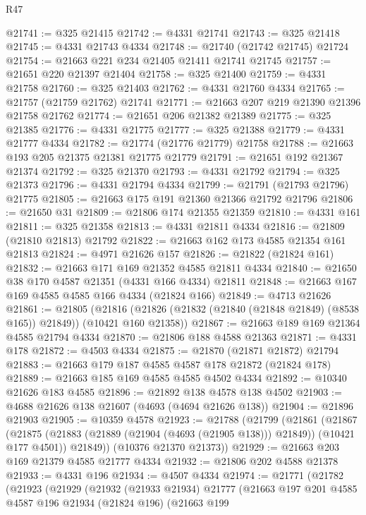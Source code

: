 \begin{lexlean}{R47}
\begin{coremodule}
@21741 := @325 @21415
@21742 := @4331 @21741
@21743 := @325 @21418
@21745 := @4331 @21743 @4334
@21748 := @21740 (@21742 @21745) @21724
@21754 := @21663 @221 @234 @21405 @21411 @21741 @21745
@21757 := @21651 @220 @21397 @21404
@21758 := @325 @21400
@21759 := @4331 @21758
@21760 := @325 @21403
@21762 := @4331 @21760 @4334
@21765 := @21757 (@21759 @21762) @21741
@21771 := @21663 @207 @219 @21390 @21396 @21758 @21762
@21774 := @21651 @206 @21382 @21389
@21775 := @325 @21385
@21776 := @4331 @21775
@21777 := @325 @21388
@21779 := @4331 @21777 @4334
@21782 := @21774 (@21776 @21779) @21758
@21788 := @21663 @193 @205 @21375 @21381 @21775 @21779
@21791 := @21651 @192 @21367 @21374
@21792 := @325 @21370
@21793 := @4331 @21792
@21794 := @325 @21373
@21796 := @4331 @21794 @4334
@21799 := @21791 (@21793 @21796) @21775
@21805 := @21663 @175 @191 @21360 @21366 @21792 @21796
@21806 := @21650 @31
@21809 := @21806 @174 @21355 @21359
@21810 := @4331 @161
@21811 := @325 @21358
@21813 := @4331 @21811 @4334
@21816 := @21809 (@21810 @21813) @21792
@21822 := @21663 @162 @173 @4585 @21354 @161 @21813
@21824 := @4971 @21626 @157
@21826 := @21822 (@21824 @161)
@21832 := @21663 @171 @169 @21352 @4585 @21811 @4334
@21840 := @21650 @38 @170 @4587 @21351 (@4331 @166 @4334) @21811
@21848 := @21663 @167 @169 @4585 @4585 @166 @4334 (@21824 @166)
@21849 := @4713 @21626
@21861 := @21805
    (@21816 (@21826 (@21832 (@21840 (@21848 @21849) (@8538 @165)) @21849)) (@10421 @160 @21358))
@21867 := @21663 @189 @169 @21364 @4585 @21794 @4334
@21870 := @21806 @188 @4588 @21363
@21871 := @4331 @178
@21872 := @4503 @4334
@21875 := @21870 (@21871 @21872) @21794
@21883 := @21663 @179 @187 @4585 @4587 @178 @21872 (@21824 @178)
@21889 := @21663 @185 @169 @4585 @4585 @4502 @4334
@21892 := @10340 @21626 @183 @4585
@21896 := @21892 @138 @4578 @138 @4502
@21903 := @4688 @21626 @138 @21607 (@4693 (@4694 @21626 @138))
@21904 := @21896 @21903
@21905 := @10359 @4578
@21923 := @21788
    (@21799
      (@21861
        (@21867
          (@21875 (@21883 (@21889 (@21904 (@4693 (@21905 @138))) @21849)) (@10421 @177 @4501))
          @21849))
      (@10376 @21370 @21373))
@21929 := @21663 @203 @169 @21379 @4585 @21777 @4334
@21932 := @21806 @202 @4588 @21378
@21933 := @4331 @196
@21934 := @4507 @4334
@21974 := @21771
    (@21782
      (@21923
        (@21929
          (@21932
            (@21933 @21934)
            @21777
            (@21663
              @197
              @201
              @4585
              @4587
              @196
              @21934
              (@21824 @196)
              (@21663
                @199

\end{coremodule}
\end{lexlean}
